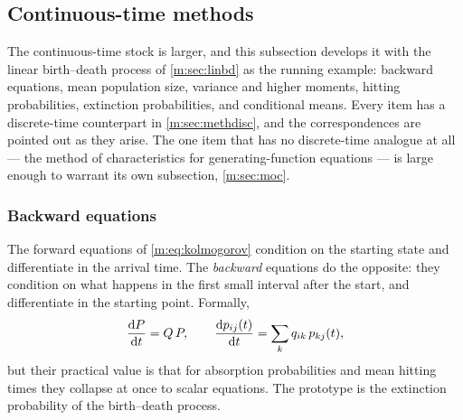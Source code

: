 \subsection{Continuous-time methods}
\label{m:sec:methct}

The continuous-time stock is larger, and this subsection develops it with the
linear birth--death process of \cref{m:sec:linbd} as the running example:
backward equations, mean population size, variance and higher moments, hitting
probabilities, extinction probabilities, and conditional means. Every item has
a discrete-time counterpart in \cref{m:sec:methdisc}, and the correspondences
are pointed out as they arise. The one item that has no discrete-time analogue
at all --- the method of characteristics for generating-function equations ---
is large enough to warrant its own subsection, \cref{m:sec:moc}.

\subsubsection{Backward equations}
\label{m:sec:backward}

The forward equations of \cref{m:eq:kolmogorov} condition on the starting state
and differentiate in the arrival time. The \emph{backward} equations do the
opposite: they condition on what happens in the first small interval after the
start, and differentiate in the starting point. Formally,
\begin{equation}
\label{m:eq:backwardkolm}
\frac{\mathrm{d} P}{\mathrm{d} t} = Q\,P ,
\qquad
\frac{\mathrm{d} p_{ij}(t)}{\mathrm{d} t} = \sum_{k}q_{ik}\,p_{kj}(t) ,
\end{equation}
but their practical value is that for absorption probabilities and mean hitting
times they collapse at once to scalar equations. The prototype is the
extinction probability of the birth--death process.

